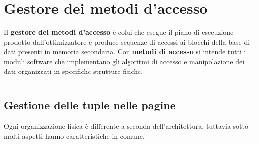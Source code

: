 \documentclass[a4paper]{article}
\newcommand{\longline}{\noindent\rule{\textwidth}{0.4pt}}
\begin{document}
	\section{Gestore dei metodi d'accesso}
	
	Il \textcolor{Red3}{\textbf{gestore dei metodi d'accesso}} è colui che esegue il piano di esecuzione prodotto dall'ottimizzatore e produce sequenze di accessi ai blocchi della base di dati presenti in memoria secondaria. Con \textbf{metodi di accesso} si intende tutti i moduli software che implementano gli algoritmi di accesso e manipolazione dei dati organizzati in specifiche strutture fisiche.

	\longline
	
	\subsection{Gestione delle tuple nelle pagine}
	
	Ogni organizzazione fisica è differente a seconda dell'architettura, tuttavia sotto molti aspetti hanno caratteristiche in comune.\newline
	
\end{document}
